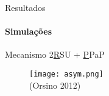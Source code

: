 \documentclass[25pt,landscape]{beamer}
\begin{document}
\begin{frame}{Resultados}
	\framesubtitle{Simula\c{c}\~oes}
	\pause
	\begin{block}{Mecanismo}
		2\underline{R}SU + \underline{P}PaP
	\end{block}
	\begin{figure}[!h]
        \centering
        \texttt{[image: asym.png]} \\
        (Orsino 2012)
    \end{figure}
\end{frame}

\end{document}
